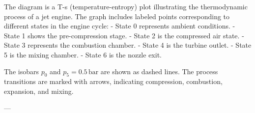 The diagram is a T-s (temperature-entropy) plot illustrating the thermodynamic process of a jet engine. The graph includes labeled points corresponding to different states in the engine cycle:  
- State 0 represents ambient conditions.  
- State 1 shows the pre-compression stage.  
- State 2 is the compressed air state.  
- State 3 represents the combustion chamber.  
- State 4 is the turbine outlet.  
- State 5 is the mixing chamber.  
- State 6 is the nozzle exit.  

The isobars \( p_0 \) and \( p_5 = 0.5 \, \text{bar} \) are shown as dashed lines. The process transitions are marked with arrows, indicating compression, combustion, expansion, and mixing.  

---